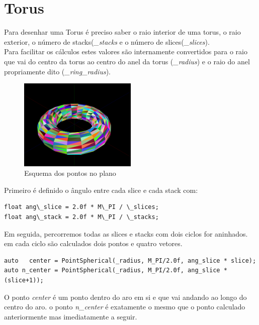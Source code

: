 \documentclass[a4paper]{report}
\begin{document}
\section{Torus}
Para desenhar uma Torus é preciso saber o raio interior de uma torus, o raio
exterior, o número de stacks(\textit{\_stacks} e o número de
slices(\textit{\_slices}).\\
Para facilitar os cálculos estes valores são internamente convertidos para o
raio que vai do centro da torus ao centro do anel da torus (\textit{\_radius}) e
o raio do anel propriamente dito (\textit{\_ring\_radius}).

\begin{figure}[H]
    \centering 
    \includegraphics[width=0.5\textwidth]{images/torus.png}
    \caption{Esquema dos pontos no plano}
    \label{fig:scheme_torus}
\end{figure}
Primeiro é definido o ângulo entre cada slice e cada stack com:
\begin{lstlisting}
float ang\_slice = 2.0f * M\_PI / \_slices;
float ang\_stack = 2.0f * M\_PI / \_stacks;
\end{lstlisting}
Em seguida, percorremos todas as slices e stacks com dois ciclos for aninhados.
em cada ciclo são calculados dois pontos e quatro vetores.\\

\begin{lstlisting}
auto   center = PointSpherical(_radius, M_PI/2.0f, ang_slice * slice);
auto n_center = PointSpherical(_radius, M_PI/2.0f, ang_slice * (slice+1));
\end{lstlisting}
O ponto \textit{center} é um ponto dentro do aro em si e que vai andando ao
longo do centro do aro. o ponto \textit{n\_center} é exatamente o mesmo que o
ponto calculado anteriormente mas imediatamente a seguir.
\end{document}
